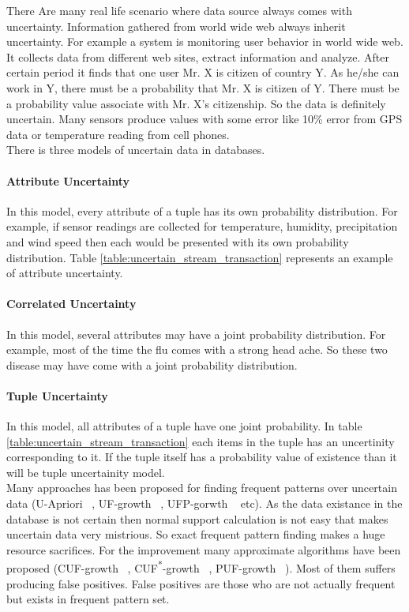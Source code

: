 There Are many real life scenario where data source always comes with uncertainty. Information gathered from world wide web always inherit uncertainty. For example a system is monitoring user behavior in world wide web. It collects data from different web sites, extract information and analyze. After certain period it finds that one user Mr. X is citizen of country Y. As he/she can work in Y, there must be a probability that Mr. X is citizen of Y. There must be a probability value associate with Mr. X's citizenship. So the data is definitely uncertain. Many sensors produce values with some error like 10\% error from GPS data or temperature reading from cell phones.\\
There is three models of uncertain data in databases.
\paragraph{Attribute Uncertainty}
In this model, every attribute of a tuple has its own probability distribution. For example, if sensor readings are collected for temperature, humidity, precipitation and wind speed then each would be presented with its own probability distribution. Table \ref{table:uncertain_stream_transaction} represents an example of attribute uncertainty.
\paragraph{Correlated Uncertainty}
In this model, several attributes may have a joint probability distribution. For example, most of the time the flu comes with a strong head ache. So these two disease may have come with a joint probability distribution.
\paragraph{Tuple Uncertainty}
In this model, all attributes of a tuple have one joint probability. In table \ref{table:uncertain_stream_transaction}  each items in the tuple has an uncertinity corresponding to it. If the tuple itself has a probability value of existence than it will be tuple uncertainity model.\\
Many approaches has been proposed for finding frequent patterns over uncertain data (U-Apriori ~\cite{u_priori}, UF-growth ~\cite{uf_growth}, UFP-gorwth ~\cite{ufp_growth} etc). As the data existance in the database is not certain then normal support calculation is not easy that makes uncertain data very mistrious. So exact frequent pattern finding makes a huge resource sacrifices. For the improvement many approximate algorithms have been proposed (CUF-growth ~\cite{cuf_growth}, CUF\textsuperscript{*}-growth ~\cite{cuf_growth}, PUF-growth ~\cite{puf_growth}). Most of them suffers producing false positives. False positives are those who are not actually frequent but exists in frequent pattern set.

